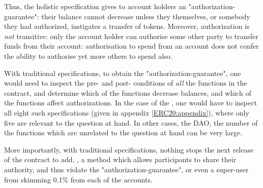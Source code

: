 %  
 
 Thus, the holistic specification gives to account holders an
 "authorization-guarantee": their balance cannot decrease unless they
 themselves, or somebody they had authorized, instigates a transfer of
 tokens. Moreover, authorization is {\em not} transitive: only the
 account holder can authorise some other party to transfer funds from
 their account: authorisation to spend from an account does not confer
 the ability to authorise yet more others to spend also.
 
 
 With traditional  specifications, to obtain the "authorization-guarantee", 
one would need to inspect the pre- and post- conditions of {\em all} the functions
in the contract, and determine which of the functions decrease balances, and which of the functions 
 affect authorizations.
 In the case of the , one would have to inspect all eight such specifications
 (given in appendix \ref{ERC20:appendix}), 
 where only five are relevant to the question at hand.
 In other cases, \eg the DAO, the number of the functions which are unrelated
 to the question at hand can be very large.
  
More importantly, with traditional  specifications, nothing stops the next release of the contract to add, 
\eg, a method which allows participants to share their authority, and thus
violate the "authorization-guarantee", or even a super-user from skimming 0.1\% from each of the accounts.

